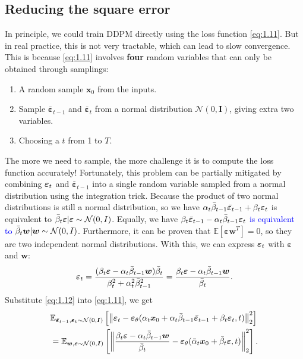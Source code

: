 \subsection{Reducing the square error}
In principle, we could train DDPM directly using the loss function \cref{eq:1.11}. But in real practice, this is not very tractable, which can lead to slow convergence. This is because \cref{eq:1.11} involves \textbf{four} random variables that can only be obtained through samplings:
\begin{enumerate}
    \item A random sample $\bm{x}_0$ from the inputs.
    \item Sample $\bar{\bm{\varepsilon}}_{t-1}$ and $\bar{\bm{\varepsilon}}_{t}$ from a normal distribution $\mathcal{N}(0,\bm{I})$, giving extra two variables.
    \item Choosing a $t$ from 1 to $T$.
\end{enumerate}
The more we need to sample, the more challenge it is to compute the loss function accurately! Fortunately, this problem can be partially mitigated by combining $\bm{\varepsilon}_t$ and $\bar{\bm{\varepsilon}}_{t-1}$ into a single random variable sampled from a normal distribution using the integration trick. Because the product of two normal distributions is still a normal distribution, so we have $\alpha_t\bar{\beta}_{t-1}\bar{\bm{\varepsilon}}_{t-1}+\beta_t\bm{\varepsilon}_t$ is equivalent to $\bar{\beta}_t\bm{\varepsilon}|\bm{\varepsilon}\sim\mathcal{N}(0,I)$. Equally, we have \textcolor{blue}{$\beta_t\bar{\bm{\varepsilon}}_{t-1}-\alpha_t\bar{\beta}_{t-1}\bm{\varepsilon}_t$ is equivalent to $\bar{\beta}_t\bm{w}|\bm{w}\sim\mathcal{N}(0,I)$}.\marginnote{\footnotesize{\textcolor{blue}{Not quite sure where this comes from?}}} Furthermore, it can be proven that $\mathbb{E}[\bm{\varepsilon}\bm{w}^T]=0$, so they are two independent normal distributions. With this, we can express $\bm{\varepsilon}_t$ with $\bm{\varepsilon}$ and $\bm{w}$:
\begin{equation}
    \label{eq:1.12}
    \bm{\varepsilon}_t=\frac{(\beta_t\bm{\varepsilon}-\alpha_t\bar{\beta}_{t-1}\bm{w})\bar{\beta}_t}{\beta_t^2+\alpha_t^2\bar{\beta}_{t-1}^2}=\frac{\beta_t\bm{\varepsilon}-\alpha_t\bar{\beta}_{t-1}\bm{w}}{\bar{\beta}_t}.
\end{equation}
Substitute \cref{eq:1.12} into \cref{eq:1.11}, we get
\begin{align}
    &\mathbb{E}_{\bar{\bm{\varepsilon}}_{t-1},\bm{\varepsilon}_t\sim\mathcal{N}(0,\bm{I})}\left[\left\| \bm{\varepsilon}_t-\bm{\varepsilon}_\theta(\alpha_t\bm{x}_0+\alpha_t\bar{\beta}_{t-1}\bar{\bm{\varepsilon}}_{t-1}+\beta_t\bm{\varepsilon}_t,t) \right\|_2^2\right]\nonumber\\
    &=\mathbb{E}_{\bm{w},\bm{\varepsilon}\sim\mathcal{N}(0,\bm{I})}\left[\left\| \frac{\beta_t\bm{\varepsilon}-\alpha_t\bar{\beta}_{t-1}\bm{w}}{\bar{\beta}_t}-\bm{\varepsilon}_\theta (\bar{\alpha}_t\bm{x}_0+\bar{\beta}_t\bm{\varepsilon},t)   \right\|_2^2 \right]. \label{eq:1.13}
\end{align}
